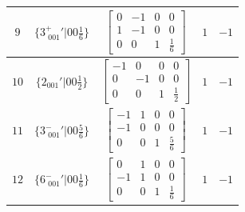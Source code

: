 \documentclass[fleqn,8pt]{jsarticle}
\begin{document}
\begin{longtable}{ccccc}
$ 9 $ & $ \{3^{+}_{\,\,001}{}'|0 0 \frac{1}{6}\} $ & $ \begin{bmatrix} 0 & -1 & 0 & 0 \\ 1 & -1 & 0 & 0 \\ 0 & 0 & 1 & \frac{1}{6} \end{bmatrix} $ & $ 1 $ & $ -1 $ \\ \hline
$ 10 $ & $ \{2{}_{001}{}'|0 0 \frac{1}{2}\} $ & $ \begin{bmatrix} -1 & 0 & 0 & 0 \\ 0 & -1 & 0 & 0 \\ 0 & 0 & 1 & \frac{1}{2} \end{bmatrix} $ & $ 1 $ & $ -1 $ \\ \hline
$ 11 $ & $ \{3^{-}_{\,\,001}{}'|0 0 \frac{5}{6}\} $ & $ \begin{bmatrix} -1 & 1 & 0 & 0 \\ -1 & 0 & 0 & 0 \\ 0 & 0 & 1 & \frac{5}{6} \end{bmatrix} $ & $ 1 $ & $ -1 $ \\ \hline
$ 12 $ & $ \{6^{-}_{\,\,001}{}'|0 0 \frac{1}{6}\} $ & $ \begin{bmatrix} 0 & 1 & 0 & 0 \\ -1 & 1 & 0 & 0 \\ 0 & 0 & 1 & \frac{1}{6} \end{bmatrix} $ & $ 1 $ & $ -1 $ \\
\end{longtable}
\end{document}
